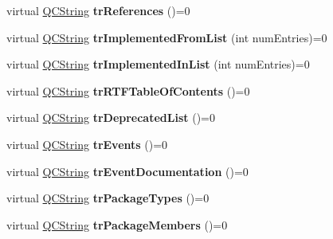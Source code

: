 \begin{DoxyCompactItemize}
\item 
\hypertarget{class_translator_a528de12430b7552f3011daa1de85ebec}{virtual \hyperlink{class_q_c_string}{Q\-C\-String} {\bfseries tr\-References} ()=0}\label{class_translator_a528de12430b7552f3011daa1de85ebec}

\item 
\hypertarget{class_translator_a98fa68042b92645c96e440759b7f5ac9}{virtual \hyperlink{class_q_c_string}{Q\-C\-String} {\bfseries tr\-Implemented\-From\-List} (int num\-Entries)=0}\label{class_translator_a98fa68042b92645c96e440759b7f5ac9}

\item 
\hypertarget{class_translator_a6e6f585ee0caaee388f7a1af92fd46fb}{virtual \hyperlink{class_q_c_string}{Q\-C\-String} {\bfseries tr\-Implemented\-In\-List} (int num\-Entries)=0}\label{class_translator_a6e6f585ee0caaee388f7a1af92fd46fb}

\item 
\hypertarget{class_translator_a1c4dbe6850023f67d2187bef6440c53f}{virtual \hyperlink{class_q_c_string}{Q\-C\-String} {\bfseries tr\-R\-T\-F\-Table\-Of\-Contents} ()=0}\label{class_translator_a1c4dbe6850023f67d2187bef6440c53f}

\item 
\hypertarget{class_translator_a49f4cfbe80e0356ea0c810f11982c992}{virtual \hyperlink{class_q_c_string}{Q\-C\-String} {\bfseries tr\-Deprecated\-List} ()=0}\label{class_translator_a49f4cfbe80e0356ea0c810f11982c992}

\item 
\hypertarget{class_translator_a80cb63c3dfef5eee4d0c57d775056d90}{virtual \hyperlink{class_q_c_string}{Q\-C\-String} {\bfseries tr\-Events} ()=0}\label{class_translator_a80cb63c3dfef5eee4d0c57d775056d90}

\item 
\hypertarget{class_translator_a83667d039abff01dfa52187372fbf93d}{virtual \hyperlink{class_q_c_string}{Q\-C\-String} {\bfseries tr\-Event\-Documentation} ()=0}\label{class_translator_a83667d039abff01dfa52187372fbf93d}

\item 
\hypertarget{class_translator_a3800c9ba75541da1ef51f97b9559866e}{virtual \hyperlink{class_q_c_string}{Q\-C\-String} {\bfseries tr\-Package\-Types} ()=0}\label{class_translator_a3800c9ba75541da1ef51f97b9559866e}

\item 
\hypertarget{class_translator_a46ed459c81878fb0fe9bd60842de897b}{virtual \hyperlink{class_q_c_string}{Q\-C\-String} {\bfseries tr\-Package\-Members} ()=0}\label{class_translator_a46ed459c81878fb0fe9bd60842de897b}


\end{DoxyCompactItemize}
